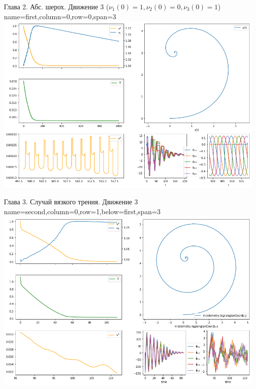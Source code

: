 \begin{mynotitleposter}
    
    \headerbox
    {Глава 2. Абс. шерох. Движение 3 ($\nu_1(0) = 1, \nu_2(0) = 0, \nu_3(0) = 1$)}
    {name=first,column=0,row=0,span=3}
    {
        {\huge\bf
            \centering
            \includegraphics[width=\linewidth]{content/pic/new/impact_3.png}
            \vspace{-10pt}
        }
    }
    
    \headerbox
    {Глава 3. Случай вязкого трения. Движение 3}
    {name=second,column=0,row=1,below=first,span=3}
    {
        {\huge\bf
            \centering
            \includegraphics[width=\linewidth]{content/pic/new/visc_3_100.png}
        }
    }
\end{mynotitleposter}

